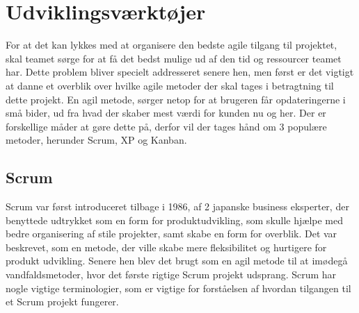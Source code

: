 
\chapter{Udviklingsværktøjer}\label{ch:udviklingsv}

For at det kan lykkes med at organisere den bedste agile tilgang til projektet, skal teamet sørge for at få det bedst mulige ud af den tid og ressourcer teamet har. Dette problem bliver specielt addresseret senere hen, men først er det vigtigt at danne et overblik over hvilke agile metoder der skal tages i betragtning til dette projekt. En agil metode, sørger netop for at brugeren får opdateringerne i små bider, ud fra hvad der skaber mest værdi for kunden nu og her. Der er forskellige måder at gøre dette på, derfor vil der tages hånd om 3 populære metoder, herunder Scrum, XP og Kanban. 

\section{Scrum}

Scrum var først introduceret tilbage i 1986, af 2 japanske business eksperter, der benyttede udtrykket som en form for produktudvikling, som skulle hjælpe med bedre organisering af stile projekter, samt skabe en form for overblik. Det var beskrevet, som en metode, der ville skabe mere fleksibilitet og hurtigere for produkt udvikling. Senere hen blev det brugt som en agil metode til at imødegå vandfaldsmetoder, hvor det første rigtige Scrum projekt udsprang\cite{ScrumHistory}.  Scrum har nogle vigtige terminologier, som er vigtige for forståelsen af hvordan tilgangen til et Scrum projekt fungerer. 

